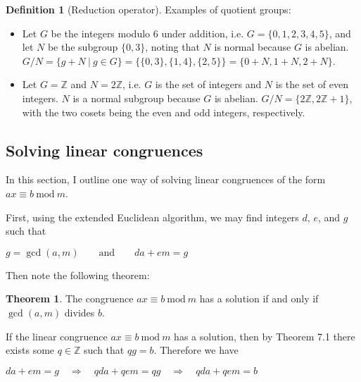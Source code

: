 \documentclass{article}
\theoremstyle{definition}
\newtheorem{definition}{Definition}[section]
\theoremstyle{theorem}
\newtheorem{theorem}{Theorem}[section]
\theoremstyle{example}
\theoremstyle{corollary}
\begin{document}
\begin{definition}[Reduction operator]
Examples of quotient groups:
\begin{itemize}
\item Let \(G\) be the integers modulo 6 under addition, i.e. \(G = \{ 0, 1, 2, 3, 4, 5 \}\), and let \(N\) be the subgroup \(\{ 0, 3 \}\), noting that \(N\) is normal because \(G\) is abelian. \(G/N = \{g + N \ | \ g \in G \} = \{ \{0,3\}, \{1,4\}, \{2,5\} \} = \{ 0 + N, 1 + N, 2 + N \}\).
\item Let \(G = \mathbb{Z}\) and \(N = 2\mathbb{Z}\), i.e. \(G\) is the set of integers and \(N\) is the set of even integers. \(N\) is a normal subgroup because \(G\) is abelian. \(G/N = \{ 2\mathbb{Z}, 2\mathbb{Z} + 1 \}\), with the two cosets being the even and odd integers, respectively.
\end{itemize}

\bigskip

\subsection{Solving linear congruences}

\bigskip

In this section, I outline one way of solving linear congruences of the form \(ax \equiv b \ \textrm{mod} \ m\).

\bigskip

First, using the extended Euclidean algorithm, we may find integers \(d\), \(e\), and \(g\) such that
\begin{center}
\(g = \gcd(a, m) \quad \quad \textrm{and} \quad \quad da + em = g\)
\end{center}

\bigskip

Then note the following theorem:

\bigskip

\theoremstyle{theorem}
\begin{theorem}
The congruence \(ax \equiv b \ \textrm{mod} \ m\) has a solution if and only if \(\gcd(a, m)\) divides \(b\).
\end{theorem}

\bigskip

If the linear congruence \(ax \equiv b \ \textrm{mod} \ m\) has a solution, then by Theorem 7.1 there exists some \(q \in \mathbb{Z}\) such that \(qg = b\). Therefore we have
\begin{center}
\(da + em = g \quad \Rightarrow \quad qda + qem = qg \quad \Rightarrow \quad qda + qem = b\)
\end{center}


\end{definition}
\end{document}
